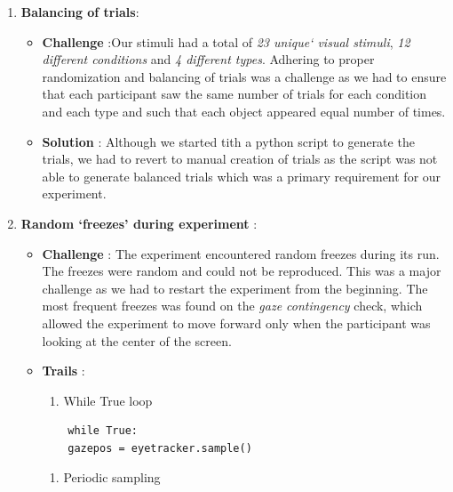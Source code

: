 \documentclass[
  a4paper,
]{article}
\providecommand{\tightlist}{%
  \setlength{\itemsep}{0pt}\setlength{\parskip}{0pt}}\usepackage{longtable,booktabs,array}
\begin{document}
\begin{enumerate}
\def\labelenumi{\arabic{enumi}.}
\tightlist
\item
  \textbf{Balancing of trials}:

  \begin{itemize}
  \tightlist
  \item
    \textbf{Challenge} :Our stimuli had a total of \emph{23 unique`
    visual stimuli}, \emph{12 different conditions} and \emph{4
    different types}. Adhering to proper randomization and balancing of
    trials was a challenge as we had to ensure that each participant saw
    the same number of trials for each condition and each type and such
    that each object appeared equal number of times.
  \item
    \textbf{Solution} : Although we started tith a python script to
    generate the trials, we had to revert to manual creation of trials
    as the script was not able to generate balanced trials which was a
    primary requirement for our experiment.
  \end{itemize}
\item
  \textbf{Random `freezes' during experiment} :

  \begin{itemize}
  \item
    \textbf{Challenge} : The experiment encountered random freezes
    during its run. The freezes were random and could not be reproduced.
    This was a major challenge as we had to restart the experiment from
    the beginning. The most frequent freezes was found on the \emph{gaze
    contingency} check, which allowed the experiment to move forward
    only when the participant was looking at the center of the screen.
  \item
    \textbf{Trails} :

    \begin{enumerate}
    \def\labelenumii{\arabic{enumii}.}
    \tightlist
    \item
      While True loop
    \end{enumerate}

\begin{verbatim}
    while True:
    gazepos = eyetracker.sample()
\end{verbatim}

    \begin{enumerate}
    \def\labelenumii{\arabic{enumii}.}
    \setcounter{enumii}{1}
    \tightlist
    \item
      Periodic sampling
    \end{enumerate}


\end{itemize}
\end{enumerate}
\end{document}
